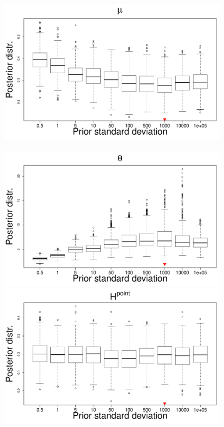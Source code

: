 \documentclass{statsoc}
\begin{document}
\begin{figure}
\centering
\includegraphics[scale=0.25]{Sensitivity/mu_sensitivity.pdf}~
\includegraphics[scale=0.25]{Sensitivity/theta_sensitivity.pdf}\\
\includegraphics[scale=0.25]{Sensitivity/H_point_sensitivity.pdf}~

\end{figure}
\end{document}

